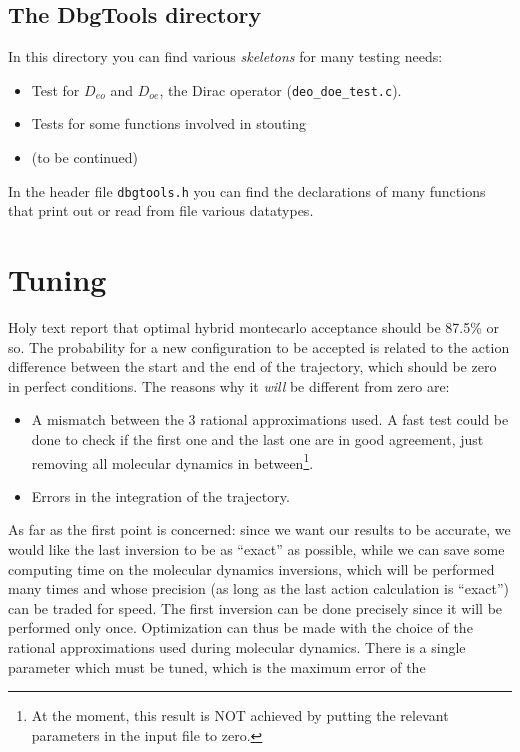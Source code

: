 \subsection{The DbgTools directory}
In this directory you can find various \emph{skeletons} for many testing needs:
\begin{itemize}
    \item Test for $D_{eo}$ and $D_{oe}$, the Dirac 
        operator (\verb|deo_doe_test.c|).
    \item Tests for some functions involved in stouting
    \item (to be continued)
\end{itemize}
In the header file \verb|dbgtools.h| you can find the declarations of many 
functions that print out or read from file various datatypes.


\section{Tuning}
\label{tuning}
Holy text report that optimal hybrid montecarlo acceptance should be 87.5\% or 
so. 
The probability for a new configuration to be accepted is related to the action 
difference between the start and the end of the trajectory, which should be zero 
in 
perfect conditions. The reasons why it \emph{will} be different from zero are:
\begin{itemize}
    \item A mismatch between the 3 rational approximations used. A fast test could 
        be done 
        to check if the first one and the last one are in good agreement, just removing 
        all 
        molecular dynamics in between\footnote{At the moment, this result is NOT 
            achieved by 
        putting the relevant parameters in the input file to zero.}. 
    \item Errors in the integration of the trajectory.
\end{itemize}
As far as the first point is concerned: since we want our results to be 
accurate, we 
would like the last inversion to be as 
``exact'' as possible, while we can save some computing time on the molecular 
dynamics 
inversions, which will be performed many times and whose precision (as long as 
the last 
action calculation is ``exact'') can be traded for speed. The first inversion 
can be 
done precisely since it will be performed only once. Optimization can thus be 
made with
the choice of the rational approximations used during molecular dynamics. There 
is a 
single parameter which must be tuned, which is the maximum error of the 
